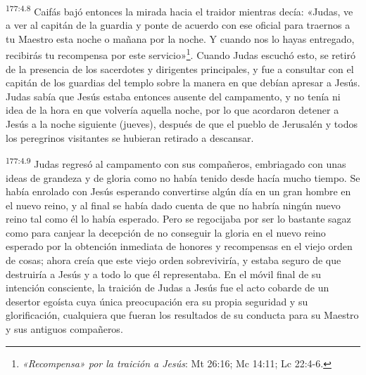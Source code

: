 \par
\textsuperscript{177:4.8} Caifás bajó entonces la mirada hacia el traidor mientras decía: «Judas, ve a ver al capitán de la guardia y ponte de acuerdo con ese oficial para traernos a tu Maestro esta noche o mañana por la noche. Y cuando nos lo hayas entregado, recibirás tu recompensa por este servicio»\footnote{\textit{«Recompensa» por la traición a Jesús}: Mt 26:16; Mc 14:11; Lc 22:4-6.}. Cuando Judas escuchó esto, se retiró de la presencia de los sacerdotes y dirigentes principales, y fue a consultar con el capitán de los guardias del templo sobre la manera en que debían apresar a Jesús. Judas sabía que Jesús estaba entonces ausente del campamento, y no tenía ni idea de la hora en que volvería aquella noche, por lo que acordaron detener a Jesús a la noche siguiente (jueves), después de que el pueblo de Jerusalén y todos los peregrinos visitantes se hubieran retirado a descansar.

\par
\textsuperscript{177:4.9} Judas regresó al campamento con sus compañeros, embriagado con unas ideas de grandeza y de gloria como no había tenido desde hacía mucho tiempo. Se había enrolado con Jesús esperando convertirse algún día en un gran hombre en el nuevo reino, y al final se había dado cuenta de que no habría ningún nuevo reino tal como él lo había esperado. Pero se regocijaba por ser lo bastante sagaz como para canjear la decepción de no conseguir la gloria en el nuevo reino esperado por la obtención inmediata de honores y recompensas en el viejo orden de cosas; ahora creía que este viejo orden sobreviviría, y estaba seguro de que destruiría a Jesús y a todo lo que él representaba. En el móvil final de su intención consciente, la traición de Judas a Jesús fue el acto cobarde de un desertor egoísta cuya única preocupación era su propia seguridad y su glorificación, cualquiera que fueran los resultados de su conducta para su Maestro y sus antiguos compañeros.

